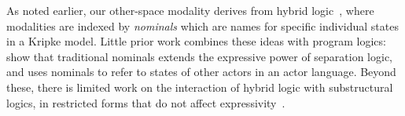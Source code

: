 As noted earlier, our other-space modality derives from hybrid logic~\cite{areces2001hybrid,blackburn1995hybrid,gargov1993modal,goranko1996hierarchies},
where modalities are indexed by \emph{nominals} which are names for specific individual states in a Kripke model.
Little prior work combines these ideas with program logics: \citet{brotherston2014parametric} show that traditional
nominals extends the expressive power of separation logic, and \citet{gordon2019modal}
uses nominals to refer to states of other actors in an actor language.
Beyond these, there is limited work on the interaction of hybrid logic with substructural logics, in restricted forms
that do not affect expressivity~\cite{despeyroux2014hybrid,chaudhuri2019hybrid}.

